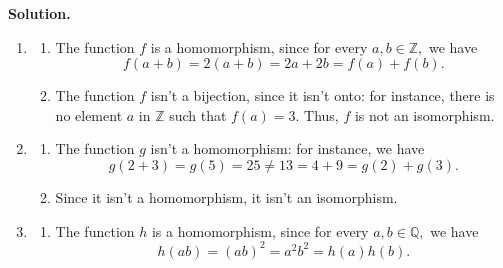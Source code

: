 \documentclass[10pt,]{book}
\theoremstyle{plain}
\theoremstyle{definition}
\theoremstyle{definition}
\theoremstyle{definition}
\theoremstyle{definition}
\numberwithin{equation}{section}
\def\Z{\mathbb{Z}}
\def\Q{\mathbb{Q}}
\begin{document}
\begin{exerciselist}
\par\smallskip
\par\smallskip
\noindent\textbf{Solution.}\hypertarget{solution-22}{}\quad
\leavevmode%
\begin{enumerate}[label=(\alph*)]
\item\hypertarget{li-165}{}%
\begin{enumerate}[label=\roman*.]
\item\hypertarget{li-166}{}
            The function \(f\) is a homomorphism, since for every \(a,b \in
            \Z,\) we have
\begin{equation*}

              f(a+b)=2(a+b)=2a+2b=f(a)+f(b).
            
\end{equation*}

\item\hypertarget{li-167}{}
            The function \(f\) isn't a bijection, since it isn't onto: for instance, there is
            no element \(a\) in \(\Z\) such that \(f(a)=3\). Thus, \(f\) is not an
            isomorphism.
\end{enumerate}
%
\item\hypertarget{li-168}{}%
\begin{enumerate}[label=\roman*.]
\item\hypertarget{li-169}{}
            The function \(g\) isn't a homomorphism: for instance, we have
\begin{equation*}

              g(2+3)=g(5)=25\neq 13=4+9=g(2)+g(3).
            
\end{equation*}

\item\hypertarget{li-170}{}
            Since it isn't a homomorphism, it isn't an isomorphism.
\end{enumerate}
%
\item\hypertarget{li-171}{}%
\begin{enumerate}[label=\roman*.]
\item\hypertarget{li-172}{}
            The function \(h\) is a homomorphism, since for every \(a,b \in
            \Q,\) we have
\begin{equation*}

              h(ab)=(ab)^2=a^2b^2=h(a)h(b).
            
\end{equation*}


\end{enumerate}
\end{enumerate}
\end{exerciselist}
\end{document}
